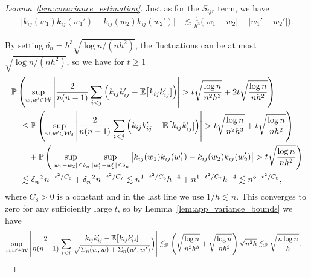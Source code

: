\begin{proof}[Lemma~\ref{lem:covariance_estimation}]

  Just as for the $S_{ijr}$ term,
  we have
  \begin{align*}
    \big|
    k_{ij}(w_1)
    k_{ij}(w_1')
    - k_{ij}(w_2)
    k_{ij}(w_2')
    \big|
    &\lesssim
    \frac{1}{h^3}
    \Big(
    |w_1 - w_2|
    + |w_1' - w_2'|
    \Big).
  \end{align*}


  By setting
  $\delta_n = h^3\sqrt{\log n / (nh^2)}$,
  the fluctuations can be at most $\sqrt{\log n / (nh^2)}$,
  so we have for $t \geq 1$
  \begin{align*}
    &\mathbb{P}\left(
      \sup_{w,w' \in \mathcal{W}}
      \left|
      \frac{2}{n(n-1)}
      \sum_{i<j}
      \Big(
      k_{ij} k_{ij}'
      - \mathbb{E}\big[k_{ij} k_{ij}']
      \Big)
      \right|
      > t \sqrt{\frac{\log n}{n^2h^3}}
      + 2t \sqrt{\frac{\log n}{nh^2}}
    \right) \\
    &\quad\leq
    \mathbb{P}\left(
      \sup_{w,w' \in \mathcal{W}_\delta}
      \left|
      \frac{2}{n(n-1)}
      \sum_{i<j}
      \Big(
      k_{ij} k_{ij}'
      - \mathbb{E}\big[k_{ij} k_{ij}']
      \Big)
      \right|
      > t \sqrt{\frac{\log n}{n^2h^3}}
      + t \sqrt{\frac{\log n}{nh^2}}
    \right) \\
    &\qquad+
    \mathbb{P}\left(
      \sup_{|w_1-w_2| \leq \delta_n}
      \sup_{|w_1'-w_2'| \leq \delta_n}
      \big|
      k_{ij}(w_1)
      k_{ij}(w_1')
      - k_{ij}(w_2)
      k_{ij}(w_2')
      \big|
      > t \sqrt{\frac{\log n}{nh^2}}
    \right) \\
    &\quad\lesssim
    \delta_n^{-2} n^{-t^2 / C_6}
    + \delta_n^{-2} n^{-t^2 / C_7}
    \lesssim
    n^{1-t^2 / C_6} h^{-4}
    + n^{1-t^2 / C_7} h^{-4}
    \lesssim
    n^{5-t^2 / C_8},
  \end{align*}
  where $C_8 > 0$ is a constant and
  in the last line we use $1/h \lesssim n$.
  This converges to zero for any sufficiently large $t$,
  so by Lemma~\ref{lem:app_variance_bounds} we have
  \begin{align*}
    \sup_{w,w' \in \mathcal{W}}
    \left|
    \frac{2}{n(n-1)}
    \sum_{i<j}
    \frac{k_{ij} k_{ij}' - \mathbb{E}\big[k_{ij} k_{ij}']}
    {\sqrt{\Sigma_n(w,w) + \Sigma_n(w',w')}}
    \Big)
    \right|
    &\lesssim_{\mathbb{P}}
    \left(
      \sqrt{\frac{\log n}{n^2h^3}}
      + \sqrt{\frac{\log n}{nh^2}}
    \right)
    \sqrt{n^2h}
    \lesssim_{\mathbb{P}}
    \sqrt{\frac{n \log n}{h}}.
  \end{align*}


\end{proof}
